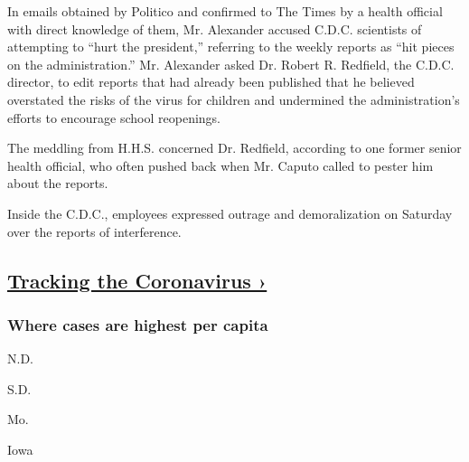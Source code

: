 In emails obtained by Politico and confirmed to The Times by a health
official with direct knowledge of them, Mr. Alexander accused C.D.C.
scientists of attempting to ``hurt the president,'' referring to the
weekly reports as ``hit pieces on the administration.'' Mr. Alexander
asked Dr. Robert R. Redfield, the C.D.C. director, to edit reports that
had already been published that he believed overstated the risks of the
virus for children and undermined the administration's efforts to
encourage school reopenings.

The meddling from H.H.S. concerned Dr. Redfield, according to one former
senior health official, who often pushed back when Mr. Caputo called to
pester him about the reports.

Inside the C.D.C., employees expressed outrage and demoralization on
Saturday over the reports of interference.

\hypertarget{tracking-the-coronavirus-}{%
\subsection{\texorpdfstring{\href{https://www.nytimes3xbfgragh.onion/interactive/2020/us/coronavirus-us-cases.html}{Tracking
the Coronavirus
›}}{Tracking the Coronavirus ›}}\label{tracking-the-coronavirus-}}

\href{https://www.nytimes3xbfgragh.onion/interactive/2020/us/coronavirus-us-cases.html}{}

\hypertarget{where-cases-are-highest-per-capita}{%
\subsubsection{\texorpdfstring{Where cases are \textbf{highest} per
capita}{Where cases are highest per capita}}\label{where-cases-are-highest-per-capita}}

\href{https://www.nytimes3xbfgragh.onion/interactive/2020/us/north-dakota-coronavirus-cases.html}{}

N.D.
\href{https://www.nytimes3xbfgragh.onion/interactive/2020/us/south-dakota-coronavirus-cases.html}{}

S.D.
\href{https://www.nytimes3xbfgragh.onion/interactive/2020/us/missouri-coronavirus-cases.html}{}

Mo.
\href{https://www.nytimes3xbfgragh.onion/interactive/2020/us/iowa-coronavirus-cases.html}{}

Iowa
\href{https://www.nytimes3xbfgragh.onion/interactive/2020/us/arkansas-coronavirus-cases.html}{}

